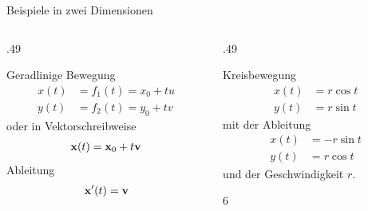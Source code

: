 \begin{frame}{Beispiele in zwei Dimensionen}
    \begin{columns}
        \begin{column}[t]{.49\textwidth}
        \begin{block}{Geradlinige Bewegung}
            \begin{align*}
                x(t) &= f_1(t) = x_0 + t u\\
                y(t) &= f_2(t) = y_0+tv
            \end{align*}
            oder in Vektorschreibweise
            \begin{gather*}
                \mathbf{x}(t) = \mathbf{x}_0+t\mathbf{v}
            \end{gather*}
            Ableitung
            \begin{gather*}
                \mathbf{x}'(t) = \mathbf{v}
            \end{gather*}
        \end{block}         
        \end{column}
        \pause
        \begin{column}[t]{.49\textwidth}
        \begin{block}{Kreisbewegung}
            \begin{align*}
                x(t) &= r \cos t\\
                y(t) &= r \sin t
            \end{align*}
            mit der Ableitung
            \begin{align*}
                x(t) &= -r \sin t\\
                y(t) &= r \cos t
            \end{align*}
            und der Geschwindigkeit $r$.
        \end{block}         
  6      \end{column}
    \end{columns}
\end{frame}

